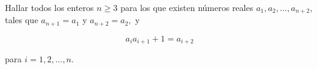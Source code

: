 Hallar todos los enteros $n \geq 3$ para los que existen números reales $a_1, a_2, \dots , a_{n+2}$, tales que $a_{n+1} =a_1$ y $a_{n+2} =a_2,$ y

\[a_ia_{i+1} + 1 = a_{i+2}\]

para $i = 1,2,\dots,n$.